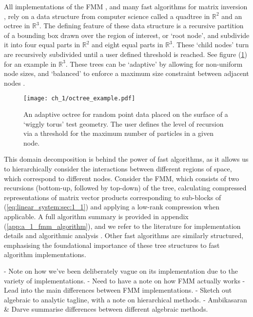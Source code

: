 All implementations of the FMM \cite{Ying:2004:JCP, fong2009black, greengard1987fast}, and many fast algorithms for matrix inversion \cite{ambikasaran2014inverse,minden2017recursive, martinsson2005fast, sushnikova2022fmm}, rely on a data structure from computer science called a quadtree in $\mathbb{R}^2$ and an octree in $\mathbb{R}^3$. The defining feature of these data structure is a recursive partition of a bounding box drawn over the region of interest, or ‘root node’, and subdivide it into four equal parts in $\mathbb{R}^2$ and eight equal parts in $\mathbb{R}^3$. These ‘child nodes’ turn are recursively subdivided until a user defined threshold is reached. See figure (\ref{fig:octree_example:sec_1_1}) for an example in $\mathbb{R}^3$. These trees can be `adaptive' by allowing for non-uniform node sizes, and `balanced' to enforce a maximum size constraint between adjacent nodes \cite{sundar2008bottom}.

\begin{figure}
    \centering
    \texttt{[image: ch\_1/octree\_example.pdf]}
    \caption{An adaptive octree for random point data placed on the surface of a `wiggly torus' test geometry. The user defines the level of recursion via a threshold for the maximum number of particles in a given node.}
    \label{fig:octree_example:sec_1_1}
\end{figure}

This domain decomposition is behind the power of fast algorithms, as it allows us to hierarchically consider the interactions between different regions of space, which correspond to different nodes. Consider the FMM, 
which consists of two recursions (bottom-up, followed by top-down) of the tree, calculating compressed representations of matrix vector products corresponding to sub-blocks of (\ref{eq:linear_system:sec:1_1}) and applying a low-rank compression when applicable. A full algorithm summary is provided in appendix (\ref{app:a_1_fmm_algorithm}), and we refer to the literature for implementation details and algorithmic analysis \cite{greengard1987fast,fong2009black,Ying:2004:JCP}. Other fast algorithms are similarly structured, emphasising the foundational importance of these tree structures to fast algorithm implementations.

- Note on how we've been deliberately vague on its implementation due to the variety of implementations. 
- Need to have a note on how FMM actually works
- Lead into the main differences between FMM implementations. 
- Sketch out algebraic to analytic tagline, with a note on hierarchical methods.
- Ambikasaran \& Darve summarise differences between different algebraic methods.


